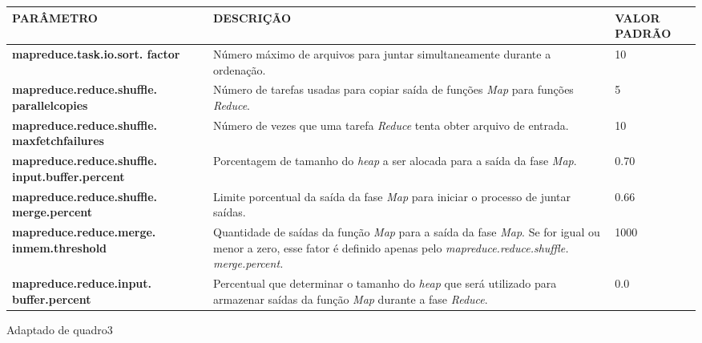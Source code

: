 {\footnotesize
  \centering
  \begin{tabular}{|p{40mm}|p{50mm}|p{30mm}|}\hline
    \textbf{PARÂMETRO}                                      & \textbf{DESCRIÇÃO}                                                                                                                                                                      & \textbf{VALOR PADRÃO} \\\hline
    \textbf{mapreduce.task.io.sort. factor}                 & Número máximo de arquivos para juntar simultaneamente durante a ordenação.                                                                                                              & 10                    \\\hline
    \textbf{mapreduce.reduce.shuffle. parallelcopies}       & Número de tarefas usadas para copiar saída de funções \textit{Map} para funções \textit{Reduce}.                                                                                        & 5                     \\\hline
    \textbf{mapreduce.reduce.shuffle. maxfetchfailures}     & Número de vezes que uma tarefa \textit{Reduce} tenta obter arquivo de entrada.                                                                                                          & 10                    \\\hline
    \textbf{mapreduce.reduce.shuffle. input.buffer.percent} & Porcentagem de tamanho do \textit{heap} a ser alocada para a saída da fase \textit{Map}.                                                                                                & 0.70                  \\\hline
    \textbf{mapreduce.reduce.shuffle. merge.percent}        & Limite porcentual da saída da fase \textit{Map} para iniciar o processo de juntar saídas.                                                                                               & 0.66                  \\\hline
    \textbf{mapreduce.reduce.merge. inmem.threshold}        & Quantidade de saídas da função \textit{Map} para a saída da fase \textit{Map}. Se for igual ou menor a zero, esse fator é definido apenas pelo \textit{mapreduce.reduce.shuffle. merge.percent.} & 1000                  \\\hline
    \textbf{mapreduce.reduce.input. buffer.percent}         & Percentual que determinar o tamanho do \textit{heap} que será utilizado para armazenar saídas da função \textit{Map} durante a fase \textit{Reduce}.                                    & 0.0                   \\\hline
  \end{tabular}}
{Adaptado de \cite{HadoopBook15}}{quadro3}{}{}

